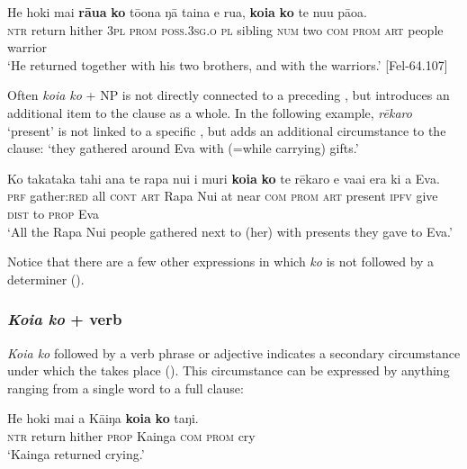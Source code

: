\ea\label{ex:8.202}
\gll He hoki mai \textbf{rāua} \textbf{ko} tō{\ꞌ}ona ŋā taina e rua, \textbf{koia} \textbf{ko} te nu{\ꞌ}u pāoa.\\
\textsc{ntr} return hither \textsc{3pl} \textsc{prom} \textsc{poss.3sg.o} \textsc{pl} sibling \textsc{num} two \textsc{com} \textsc{prom} \textsc{art} people warrior\\

\glt
‘He returned together with his two brothers, and with the warriors.’ [Fel-64.107]
\z

Often \textit{koia ko} + NP is not directly connected to a preceding , but introduces an additional item to the clause as a whole. In the following example, \textit{rēkaro} ‘present’ is not linked to a specific , but adds an additional circumstance to the clause: ‘they gathered around Eva with (=while carrying) gifts.’

\ea\label{ex:8.203}
\gll Ko takataka tahi {\ꞌ}ana te rapa nui {\ꞌ}i muri \textbf{koia} \textbf{ko} te rēkaro  e va{\ꞌ}ai era ki a Eva.\\
\textsc{prf} gather:\textsc{red} all \textsc{cont} \textsc{art} Rapa Nui at near \textsc{com} \textsc{prom} \textsc{art} present  \textsc{ipfv} give \textsc{dist} to \textsc{prop} Eva\\

\glt 
‘All the Rapa Nui people gathered next to (her) with presents they gave to Eva.’ \textstyleExampleref{[R210.218]} 
\z

Notice that there are a few other expressions in which \textit{ko} is not followed by a determiner ().

\subsubsection{\textit{Koia ko} + verb}\label{sec:8.10.4.2}
\textit{Koia ko} followed by a verb phrase or adjective indicates a secondary circumstance under which the  takes place (). This circumstance can be expressed by anything ranging from a single word to a full clause:

\ea\label{ex:8.204}
\gll He hoki mai a Kāiŋa \textbf{koia} \textbf{ko} taŋi.\\
\textsc{ntr} return hither \textsc{prop} Kainga \textsc{com} \textsc{prom} cry\\

\glt 
‘Kainga returned crying.’ \textstyleExampleref{[R243.173]} 
\z

